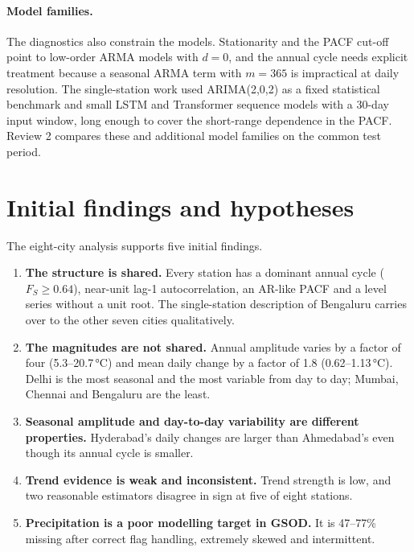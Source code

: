 \documentclass[11pt,a4paper]{article}
\newcommand{\degC}{\,\si{\degreeCelsius}}
\begin{document}
\paragraph{Model families.} The diagnostics also constrain the models. Stationarity and the PACF cut-off point to low-order ARMA models with $d = 0$, and the annual cycle needs explicit treatment because a seasonal ARMA term with $m = 365$ is impractical at daily resolution. The single-station work used ARIMA(2,0,2) as a fixed statistical benchmark and small LSTM \citep{hochreiter1997long} and Transformer \citep{vaswani2017attention} sequence models with a 30-day input window, long enough to cover the short-range dependence in the PACF. Review 2 compares these and additional model families on the common test period.

\section{Initial findings and hypotheses}
\label{sec:findings}

The eight-city analysis supports five initial findings.
\begin{enumerate}
  \item \textbf{The structure is shared.} Every station has a dominant annual cycle ($F_S \geq 0.64$), near-unit lag-1 autocorrelation, an AR-like PACF and a level series without a unit root. The single-station description of Bengaluru carries over to the other seven cities qualitatively.
  \item \textbf{The magnitudes are not shared.} Annual amplitude varies by a factor of four (5.3--20.7\degC) and mean daily change by a factor of 1.8 (0.62--1.13\degC). Delhi is the most seasonal and the most variable from day to day; Mumbai, Chennai and Bengaluru are the least.
  \item \textbf{Seasonal amplitude and day-to-day variability are different properties.} Hyderabad's daily changes are larger than Ahmedabad's even though its annual cycle is smaller.
  \item \textbf{Trend evidence is weak and inconsistent.} Trend strength is low, and two reasonable estimators disagree in sign at five of eight stations.
  \item \textbf{Precipitation is a poor modelling target in GSOD.} It is 47--77\% missing after correct flag handling, extremely skewed and intermittent.
\end{enumerate}
\end{document}

